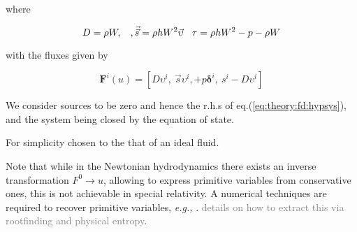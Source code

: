 where 

\begin{equation}
D = \rho W, \hspace{3mm}, \vec{\vec{s}} = \rho h W^2 \vec{\upsilon} \hspace{3mm} \tau = \rho h W^2 - p - \rho W
\end{equation}

with the fluxes given by 

\begin{equation}
\boldsymbol{F}^i(u) = [D\upsilon^i, \: \vec{s}\upsilon^i, + p\boldsymbol{\delta}^i, \: s^i-D\upsilon^i]
\end{equation}

We consider sources to be zero and hence the r.h.s of eq.(\ref{eq:theory:fd:hypsys}), and the system being closed by the equation of state. 

For simplicity chosen to the that of an ideal fluid.

Note that while in the Newtonian hydrodynamics there exists an inverse transformation $F^0\rightarrow u$, allowing to express primitive variables from conservative ones, this is not achievable in special relativity. A numerical techniques are required to recover primitive variables, \textit{e.g.,} \cite{Kastaun:2006}. \textcolor{gray}{details on how to extract this via rootfinding and physical entropy}. 